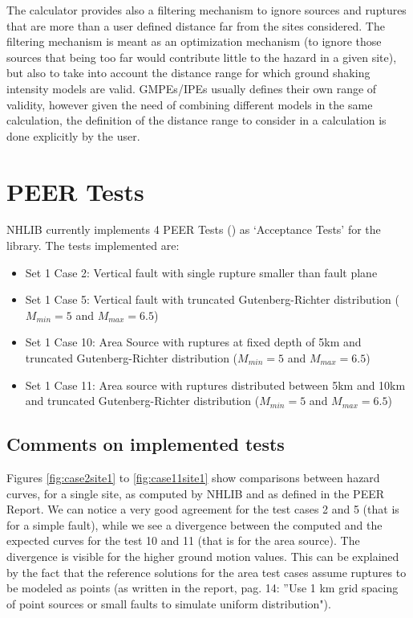 \documentclass[11pt,a4paper,headings=small,dvips]{scrartcl}
\begin{document}
The calculator provides also a filtering mechanism to ignore sources 
and ruptures that are more than a user defined distance far from the 
sites considered. The filtering mechanism is meant as an optimization 
mechanism (to ignore those sources that being too far would contribute 
little to the hazard in a given site), but also to take into account 
the distance range for which ground shaking intensity models are valid. 
GMPEs/IPEs usually defines their own range of validity, however given 
the need of combining different models in the same calculation, the 
definition of the distance range to consider in a calculation is done 
explicitly by the user.

\section{PEER Tests}\label{peer}
\setcounter{figure}{0}
NHLIB currently implements 4 PEER Tests (\cite{thomas2010}) as `Acceptance
Tests' for the library. The tests implemented are:
%
\begin{itemize}
\item Set 1 Case 2:  Vertical fault with single rupture smaller than fault 
    plane
\item Set 1 Case 5:  Vertical fault with truncated Gutenberg-Richter 
    distribution ($M_{min}=5$ and $M_{max}=6.5$)
\item Set 1 Case 10: Area Source with ruptures at fixed depth of 5km and 
    truncated Gutenberg-Richter distribution ($M_{min}=5$ and $M_{max}=6.5$)
\item Set 1 Case 11: Area source with ruptures distributed between 5km 
    and 10km and truncated Gutenberg-Richter distribution ($M_{min}=5$ 
    and $M_{max}=6.5$)
\end{itemize}

\subsection{Comments on implemented tests}
Figures \ref{fig:case2site1} to \ref{fig:case11site1} show comparisons 
between hazard curves, for a single site, as computed by NHLIB and as 
defined in the PEER Report. We can notice a very good agreement for the 
test cases 2 and 5 (that is for a simple fault), while we see a divergence 
between the computed and the expected curves for the test 10 and 11 (that 
is for the area source). The divergence is visible for the higher ground 
motion values. This can be explained by the fact that the reference 
solutions for the area test cases assume ruptures to be modeled as points 
(as written in the report, pag. 14: ''Use 1 km grid spacing of point 
sources or small faults to simulate uniform distribution"). 
\end{document}
